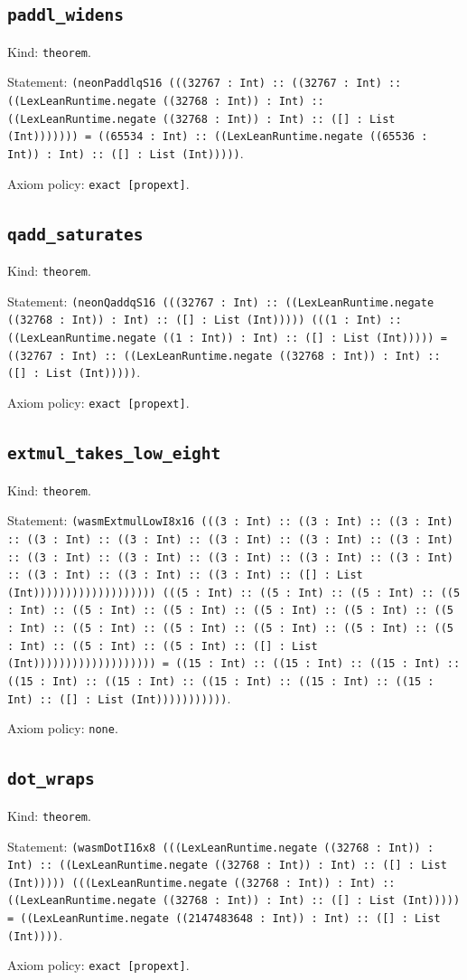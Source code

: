 \documentclass[11pt]{article}
\begin{document}
\subsection*{\texttt{paddl\_widens}}
\noindent Kind: \texttt{theorem}.\par
\noindent Statement: \texttt{(neonPaddlqS16 (((32767 : Int) :: ((32767 : Int) :: ((LexLeanRuntime.negate ((32768 : Int)) : Int) :: ((LexLeanRuntime.negate ((32768 : Int)) : Int) :: ([] : List (Int))))))) = ((65534 : Int) :: ((LexLeanRuntime.negate ((65536 : Int)) : Int) :: ([] : List (Int)))))}.\par
\noindent Axiom policy: \texttt{exact [propext]}.\par
\subsection*{\texttt{qadd\_saturates}}
\noindent Kind: \texttt{theorem}.\par
\noindent Statement: \texttt{(neonQaddqS16 (((32767 : Int) :: ((LexLeanRuntime.negate ((32768 : Int)) : Int) :: ([] : List (Int))))) (((1 : Int) :: ((LexLeanRuntime.negate ((1 : Int)) : Int) :: ([] : List (Int))))) = ((32767 : Int) :: ((LexLeanRuntime.negate ((32768 : Int)) : Int) :: ([] : List (Int)))))}.\par
\noindent Axiom policy: \texttt{exact [propext]}.\par
\subsection*{\texttt{extmul\_takes\_low\_eight}}
\noindent Kind: \texttt{theorem}.\par
\noindent Statement: \texttt{(wasmExtmulLowI8x16 (((3 : Int) :: ((3 : Int) :: ((3 : Int) :: ((3 : Int) :: ((3 : Int) :: ((3 : Int) :: ((3 : Int) :: ((3 : Int) :: ((3 : Int) :: ((3 : Int) :: ((3 : Int) :: ((3 : Int) :: ((3 : Int) :: ((3 : Int) :: ((3 : Int) :: ((3 : Int) :: ([] : List (Int))))))))))))))))))) (((5 : Int) :: ((5 : Int) :: ((5 : Int) :: ((5 : Int) :: ((5 : Int) :: ((5 : Int) :: ((5 : Int) :: ((5 : Int) :: ((5 : Int) :: ((5 : Int) :: ((5 : Int) :: ((5 : Int) :: ((5 : Int) :: ((5 : Int) :: ((5 : Int) :: ((5 : Int) :: ([] : List (Int))))))))))))))))))) = ((15 : Int) :: ((15 : Int) :: ((15 : Int) :: ((15 : Int) :: ((15 : Int) :: ((15 : Int) :: ((15 : Int) :: ((15 : Int) :: ([] : List (Int)))))))))))}.\par
\noindent Axiom policy: \texttt{none}.\par
\subsection*{\texttt{dot\_wraps}}
\noindent Kind: \texttt{theorem}.\par
\noindent Statement: \texttt{(wasmDotI16x8 (((LexLeanRuntime.negate ((32768 : Int)) : Int) :: ((LexLeanRuntime.negate ((32768 : Int)) : Int) :: ([] : List (Int))))) (((LexLeanRuntime.negate ((32768 : Int)) : Int) :: ((LexLeanRuntime.negate ((32768 : Int)) : Int) :: ([] : List (Int))))) = ((LexLeanRuntime.negate ((2147483648 : Int)) : Int) :: ([] : List (Int))))}.\par
\noindent Axiom policy: \texttt{exact [propext]}.\par
\end{document}
